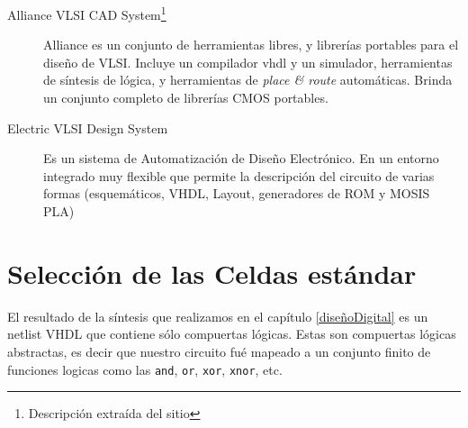 \begin{description}
\item[Alliance VLSI CAD System\footnote{Descripción extraída del sitio}]Alliance es un conjunto de herramientas libres, y librerías portables para el diseño de VLSI. Incluye un compilador vhdl y un simulador, herramientas de síntesis de lógica, y herramientas de \emph{place \& route} automáticas. Brinda un conjunto completo de librerías CMOS portables.

\item[Electric VLSI Design System] Es un sistema de Automatización de Diseño Electrónico. En un entorno integrado muy flexible que permite la descripción del circuito de varias formas (esquemáticos, VHDL, Layout, generadores de ROM y MOSIS PLA)   

\end{description}







\section{Selección de las Celdas estándar}\label{celdasEstandars}
El resultado de la síntesis que realizamos en el capítulo \ref{diseñoDigital} es un netlist VHDL que contiene sólo compuertas lógicas. Estas son compuertas lógicas abstractas, es decir que nuestro circuito fué mapeado a un conjunto finito de funciones logicas como las \verb.and., \verb.or., \verb.xor., \verb.xnor., etc.

